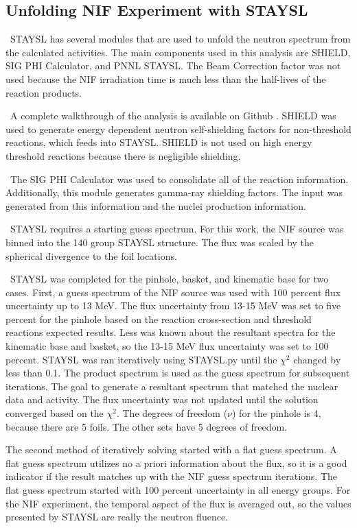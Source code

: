 \documentclass[journal]{IEEEtran}
\begin{document}
	\subsection{Unfolding NIF Experiment with STAYSL}
	\ STAYSL has several modules that are used to unfold the neutron spectrum from the calculated activities. 
The main components used in this analysis are SHIELD, SIG PHI Calculator, and PNNL STAYSL. 
The Beam Correction factor was not used because the NIF irradiation time is much less than the half-lives of the reaction products. 
	 
	\ A complete walkthrough of the analysis is available on Github \cite{Me}. 
SHIELD was used to generate energy dependent neutron self-shielding factors for non-threshold reactions, which feeds into STAYSL. 
SHIELD is not used on high energy threshold reactions because there is negligible shielding. 
	
	\ The SIG PHI Calculator was used to consolidate all of the reaction information. Additionally, this module generates gamma-ray shielding factors. 
The input was generated from this information and the nuclei production information. 
	
	\ STAYSL requires a starting guess spectrum. 
For this work, the NIF source was binned into the 140 group STAYSL structure. 
The flux was scaled by the spherical divergence to the foil locations. 
	
	\ STAYSL was completed for the pinhole, basket, and kinematic base for two cases. 
First, a guess spectrum  of the NIF source was used with 100 percent flux uncertainty up to 13 MeV. 
The flux uncertainty from 13-15 MeV was set to five percent for the pinhole based on the reaction cross-section and threshold reactions expected results. 
Less was known about the resultant spectra for the kinematic base and basket, so the 13-15 MeV flux uncertainty was set to 100 percent. 
STAYSL was ran iteratively using STAYSL.py until the $\chi^{2}$ changed by less than 0.1. 
The product spectrum is used as the guess spectrum for subsequent iterations. The goal to generate a resultant spectrum that matched the nuclear data and activity. 
The flux uncertainty was not updated until the solution converged based on the $\chi^{2}$. 
The degrees of freedom ($\nu$) for the pinhole is 4, because there are 5 foils. The other sets have 5 degrees of freedom. 
	
	The second method of iteratively solving started with a flat guess spectrum. 
A flat guess spectrum utilizes no a priori information about the flux, so it is a good indicator if the result matches up with the NIF guess spectrum iterations. 
The flat guess spectrum started with 100 percent uncertainty in all energy groups. 
For the NIF experiment, the temporal aspect of the flux is averaged out, so the values presented by STAYSL are really the neutron fluence. 
	
\end{document}
